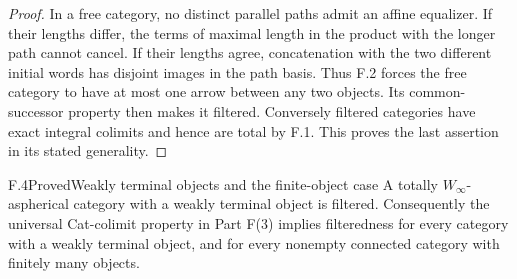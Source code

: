 \begin{proof}
In a free category, no distinct parallel paths admit an affine equalizer. If their lengths differ, the terms of maximal length in the product with the longer path cannot cancel. If their lengths agree, concatenation with the two different initial words has disjoint images in the path basis. Thus F.2 forces the free category to have at most one arrow between any two objects. Its common-successor property then makes it filtered. Conversely filtered categories have exact integral colimits and hence are total by F.1. This proves the last assertion in its stated generality.
\end{proof}

\begin{claim}{F.4}{Proved}{Weakly terminal objects and the finite-object case}
A totally $W_\infty$-aspherical category with a weakly terminal object is filtered. Consequently the universal Cat-colimit property in Part F(3) implies filteredness for every category with a weakly terminal object, and for every nonempty connected category with finitely many objects.
\end{claim}
